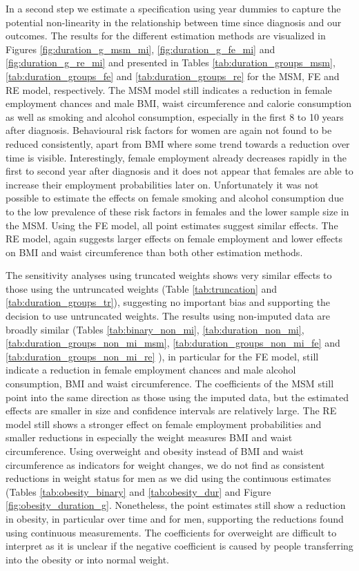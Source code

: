 In a second step we estimate a specification using year dummies to capture the potential non-linearity in the relationship between time since diagnosis and our outcomes. The results for the different estimation methods are visualized in Figures \ref{fig:duration_g_msm_mi}, \ref{fig:duration_g_fe_mi} and \ref{fig:duration_g_re_mi} and presented in Tables \ref{tab:duration_groups_msm}, \ref{tab:duration_groups_fe} and \ref{tab:duration_groups_re} for the \ac{MSM}, \ac{FE} and \ac{RE} model, respectively.  The \ac{MSM} model still indicates a reduction in female employment chances and male \ac{BMI}, waist circumference and calorie consumption as well as smoking and alcohol consumption, especially in the first 8 to 10 years after diagnosis. Behavioural risk factors for women are again not found to be reduced consistently, apart from \ac{BMI} where some trend towards a reduction over time is visible. Interestingly, female employment already decreases rapidly in the first to second year after diagnosis and it does not appear that females are able to increase their employment probabilities later on. Unfortunately it was not possible to estimate the effects on female smoking and alcohol consumption due to the low prevalence of these risk factors in females and the lower sample size in the \ac{MSM}. Using the \ac{FE} model, all point estimates suggest similar effects. The \ac{RE} model, again suggests larger effects on female employment and lower effects on \ac{BMI} and waist circumference than both other estimation methods. 

The sensitivity analyses using truncated weights shows very similar effects to those using the untruncated weights (Table \ref{tab:truncation} and \ref{tab:duration_groups_tr}), suggesting no important bias and supporting the decision to use untruncated weights. The results using non-imputed data are broadly similar (Tables \ref{tab:binary_non_mi}, \ref{tab:duration_non_mi}, \ref{tab:duration_groups_non_mi_msm}, \ref{tab:duration_groups_non_mi_fe} and \ref{tab:duration_groups_non_mi_re} ), in particular for the \ac{FE} model, still indicate a reduction in female employment chances and male alcohol consumption, \ac{BMI} and waist circumference. The coefficients of the \ac{MSM} still point into the same direction as those using the imputed data, but the estimated effects are smaller in size and confidence intervals are relatively large. The \ac{RE} model still shows a stronger effect on female employment probabilities and smaller reductions in especially the weight measures \ac{BMI} and waist circumference. Using overweight and obesity instead of \ac{BMI} and waist circumference as indicators for weight changes, we do not find as consistent reductions in weight status for men as we did using the continuous estimates (Tables \ref{tab:obesity_binary} and \ref{tab:obesity_dur} and Figure \ref{fig:obesity_duration_g}. Nonetheless, the point estimates still show a reduction in obesity, in particular over time and for men, supporting the reductions found using continuous measurements. The coefficients for overweight are difficult to interpret as it is unclear if the negative coefficient is caused by people transferring into the obesity or into normal weight.

